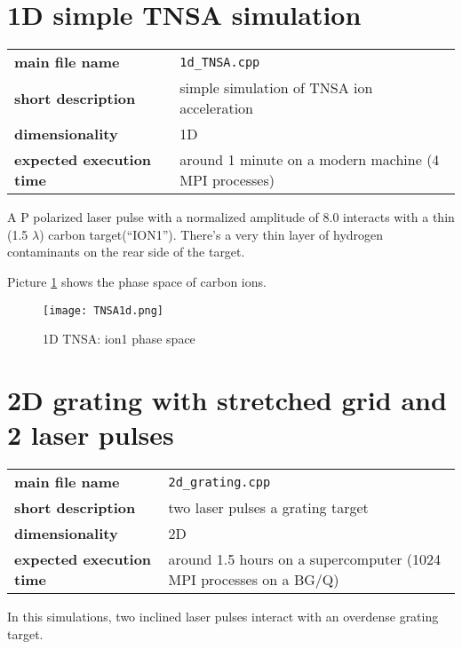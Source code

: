 \documentclass[11pt,a4paper]{report}
\begin{document}
\section{1D simple TNSA simulation}
\begin{center}
    \begin{tabular}{ l | l }
    	\textbf{main file name}          & \verb+1d_TNSA.cpp+                                     \\
    	\textbf{short description}       & simple simulation of TNSA ion acceleration             \\
    	\textbf{dimensionality}          & 1D                                                     \\
    	\textbf{expected execution time} & around 1 minute on a modern machine (4 MPI processes)
    \end{tabular}
    \end{center}
A P polarized laser pulse with a normalized amplitude of 8.0 interacts with a thin (1.5 $\lambda$) carbon target(``ION1''). There's a very thin layer of hydrogen contaminants on the rear side of the target.

Picture \ref{pic_1dTNSA} shows the phase space of carbon ions.
    
    
    \begin{figure}[htbp]
    \centering
    \texttt{[image: TNSA1d.png]}
    \caption{1D TNSA: ion1 phase space}
	\label{pic_1dTNSA}    
    \end{figure}    

\section{2D grating with stretched grid and 2 laser pulses}
\begin{center}
    \begin{tabular}{ l | l }
    	\textbf{main file name}           &  \verb+2d_grating.cpp+                                               \\
    	\textbf{short description}        &  two laser pulses  a grating target                                  \\
    	\textbf{dimensionality}           &  2D                                                                  \\
    	\textbf{expected execution time}  &  around 1.5 hours on a supercomputer (1024 MPI processes on a BG/Q)
    \end{tabular}
    \end{center}
In this simulations, two inclined laser pulses interact with an overdense grating target.
\end{document}
